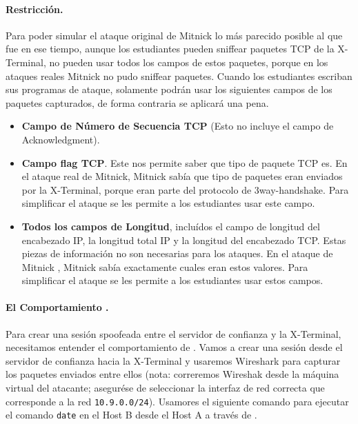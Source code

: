 \paragraph{Restricción.} Para poder simular el ataque original de Mitnick lo más parecido posible al que fue en ese tiempo, aunque los estudiantes pueden sniffear paquetes TCP de la X-Terminal, no pueden usar todos los campos de estos paquetes, porque en los ataques reales Mitnick no pudo sniffear paquetes. Cuando los estudiantes escriban sus programas de ataque, solamente podrán usar los siguientes campos de los paquetes capturados, de forma contraria se aplicará una pena.


\begin{itemize}
\item \textbf{Campo de Número de Secuencia TCP} (Esto no incluye el campo de Acknowledgment).

\item \textbf{Campo flag TCP}. Este nos permite saber que tipo de paquete TCP es. En el ataque real de Mitnick, Mitnick sabía que tipo de paquetes eran enviados por la X-Terminal, porque eran parte del protocolo de 3way-handshake. Para simplificar el ataque se les permite a los estudiantes usar este campo.


\item \textbf{Todos los campos de Longitud}, incluídos el campo de longitud del encabezado IP, la longitud total IP y la longitud del encabezado TCP. Estas piezas de información no son necesarias para los ataques. En el ataque de Mitnick , Mitnick sabía exactamente cuales eran estos valores. Para simplificar el ataque se les permite a los estudiantes usar estos campos.
\end{itemize}


\paragraph{El Comportamiento \rsh.} 
Para crear una sesión \rsh spoofeada entre el servidor de confianza y la X-Terminal, necesitamos entender el comportamiento de \rsh. Vamos a crear una sesión \rsh desde el servidor de confianza hacia la X-Terminal y usaremos Wireshark para capturar los paquetes enviados entre ellos (nota: correremos Wireshak desde la máquina virtual del atacante; asegurése de seleccionar la interfaz de red correcta que corresponde a la red \texttt{10.9.0.0/24}).
Usamores el siguiente comando para ejecutar el comando \texttt{date} en el Host B desde el Host A a través de \rsh.

